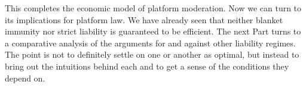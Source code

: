 This completes the economic model of platform moderation. Now we can turn to its implications for platform law. We have already seen that neither blanket immunity nor strict liability is guaranteed to be efficient. The next Part turns to a comparative analysis of the arguments for and against other liability regimes. The point is not to definitely settle on one or another as optimal, but instead to bring out the intuitions behind each and to get a sense of the conditions they depend on.
